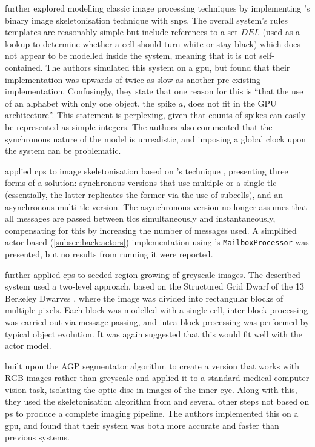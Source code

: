 \citeauthor{Diaz-Pernil2013a} \cite{Diaz-Pernil2013a} further explored modelling classic image processing techniques by implementing \citeauthor{Guo1989}'s binary image skeletonisation technique \cite{Guo1989} with \gls{snps}.  The overall system's rules templates are reasonably simple but include references to a set \(\mathit{DEL}\) (used as a lookup to determine whether a cell should turn white or stay black) which does not appear to be modelled inside the system, meaning that it is not self-contained.  The authors simulated this system on a \gls{gpu}, but found that their implementation was upwards of twice as slow as another pre-existing implementation.  Confusingly, they state that one reason for this is \enquote{that the use of an alphabet with only one object, the spike \(a\), does not fit in the GPU architecture}.  This statement is perplexing, given that counts of spikes can easily be represented as simple integers.  The authors also commented that the synchronous nature of the model is unrealistic, and imposing a global clock upon the system can be problematic.

\citeauthor{Nicolescu2014} \cite{Nicolescu2014} applied \gls{cps} to image skeletonisation based on \citeauthor{Guo1989}'s technique \cite{Guo1989}, presenting three forms of a solution: synchronous versions that use multiple or a single \gls{tlc} (essentially, the latter replicates the former via the use of subcells), and an asynchronous multi-\gls{tlc} version.  The asynchronous version no longer assumes that all messages are passed between \glspl{tlc} simultaneously and instantaneously, compensating for this by increasing the number of messages used.  A simplified \gls{actor}-based (\vref{subsec:back:actors}) implementation using \fsharp{}'s \texttt{MailboxProcessor} \cite[ch.~11]{Syme2015a} was presented, but no results from running it were reported.

\citeauthor{Nicolescu2015} \cite{Nicolescu2015} further applied \gls{cps} to seeded region growing of greyscale images.  The described system used a two-level approach, based on the \textsf{Structured Grid Dwarf} of the 13 Berkeley Dwarves \cite{Asanovic2006}, where the image was divided into rectangular blocks of multiple pixels.  Each block was modelled with a single cell, inter-block processing was carried out via message passing, and intra-block processing was performed by typical object evolution.  It was again suggested that this would fit well with the \gls{actor} model.

\citeauthor{Diaz-Pernil2016} \cite{Diaz-Pernil2016} built upon the AGP segmentator algorithm to create a version that works with RGB images rather than greyscale and applied it to a standard medical computer vision task, isolating the optic disc in images of the inner eye.  Along with this, they used the skeletonisation algorithm from \cite{Diaz-Pernil2013a} and several other steps not based on \gls{ps} to produce a complete imaging pipeline.  The authors implemented this on a \gls{gpu}, and found that their system was both more accurate and faster than previous systems.

